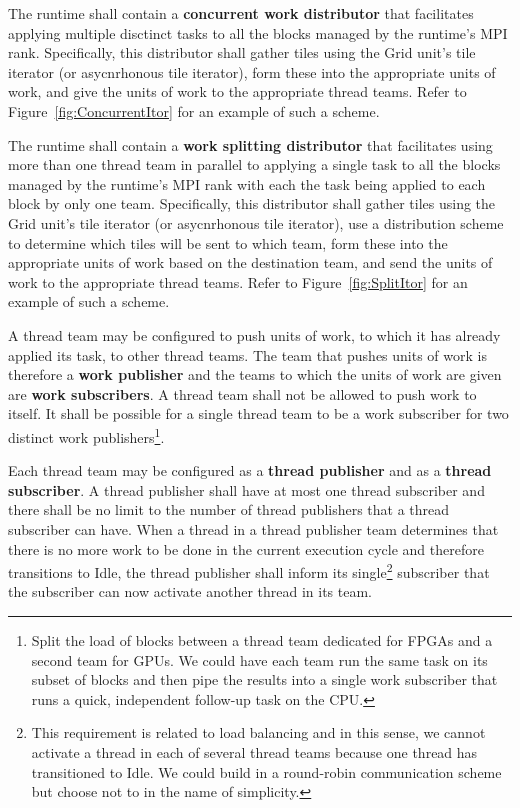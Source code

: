 \documentclass{article}
\begin{document}
\begin{req}
The runtime shall contain a \textbf{concurrent work distributor} that
facilitates applying multiple disctinct tasks to all the blocks managed by the
runtime's MPI rank.  Specifically, this distributor shall gather tiles using the
Grid unit's tile iterator (or asycnrhonous tile iterator), form these into the
appropriate units of work, and give the units of work to the appropriate thread
teams.  Refer to Figure~\ref{fig:ConcurrentItor} for an example of such a scheme.
\end{req}

\begin{req}
The runtime shall contain a \textbf{work splitting distributor} that facilitates
using more than one thread team in parallel to applying a single task to all the
blocks managed by the runtime's MPI rank with each the task being applied to
each block by only one team.  Specifically, this distributor shall
gather tiles using the Grid unit's tile iterator (or asycnrhonous tile
iterator), use a distribution scheme to determine which tiles will be sent to
which team, form these into the appropriate units of work based on the
destination team, and send the units of work to the appropriate thread teams.
Refer to Figure~\ref{fig:SplitItor} for an example of such a scheme.
\end{req}

\begin{req}
A thread team may be configured to push units of work, to which it has already
applied its task, to other thread teams.  The team that pushes units of work is
therefore a \textbf{work publisher} and the teams to which the units of work are
given are \textbf{work subscribers}.  A thread team shall not be allowed to push
work to itself.  It shall be possible for a single thread team to be a work
subscriber for two distinct work publishers\footnote{Split the load of blocks
between a thread team dedicated for FPGAs and a second team for GPUs.  We could
have each team run the same task on its subset of blocks and then pipe the
results into a single work subscriber that runs a quick, independent follow-up
task on the CPU.}.
\end{req}

\begin{req}
Each thread team may be configured as a \textbf{thread publisher} and as a
\textbf{thread subscriber}.  A thread publisher shall have at most one thread
subscriber and there shall be no limit to the number of thread publishers that a
thread subscriber can have.  When a thread in a thread publisher team determines
that there is no more work to be done in the current execution cycle and
therefore transitions to Idle, the thread publisher shall inform its
single\footnote{This requirement is related to load balancing and in this sense,
we cannot activate a thread in each of several thread teams because one thread
has transitioned to Idle.  We could build in a round-robin communication
scheme but choose not to in the name of simplicity.} subscriber that the
subscriber can now activate another thread in its team.
\end{req}
\end{document}
